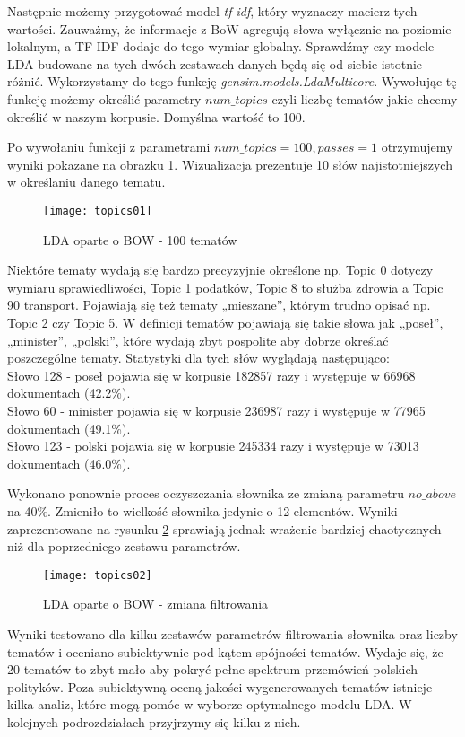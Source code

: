 \documentclass[a4paper,11pt,twoside]{report}
\theoremstyle{definition}
\begin{document}
Następnie możemy przygotować model \textit{tf-idf}, który wyznaczy macierz tych wartości. Zauważmy, że informacje z BoW agregują słowa wyłącznie na poziomie lokalnym, a TF-IDF dodaje do tego wymiar globalny. Sprawdźmy czy modele LDA budowane na tych dwóch zestawach danych będą się od siebie istotnie różnić. Wykorzystamy do tego funkcję \textit{gensim.models.LdaMulticore}. Wywołując tę funkcję możemy określić parametry $num\_topics$ czyli liczbę tematów jakie chcemy określić w naszym korpusie. Domyślna wartość to 100.

Po wywołaniu funkcji z parametrami $ num\_topics=100, passes=1$ otrzymujemy wyniki pokazane na obrazku \ref{tm01}. Wizualizacja prezentuje 10 słów najistotniejszych w określaniu danego tematu. 

\begin{figure}[h] 
\texttt{[image: topics01]} 
\centering \label{tm01} \caption{LDA oparte o BOW - 100 tematów}
\end{figure}
Niektóre tematy wydają się bardzo precyzyjnie określone np. Topic 0 dotyczy wymiaru sprawiedliwości, Topic 1 podatków, Topic 8 to służba zdrowia a Topic 90 transport. Pojawiają się też tematy „mieszane”, którym trudno opisać np. Topic 2 czy Topic 5. W definicji tematów pojawiają się takie słowa jak „poseł”, „minister”, „polski”, które wydają zbyt pospolite aby dobrze określać poszczególne tematy. Statystyki dla tych słów wyglądają następująco:\\
Słowo 128 - poseł pojawia się w korpusie 182857 razy i występuje w 66968 dokumentach (42.2\%).\\
Słowo 60 - minister pojawia się w korpusie 236987 razy i występuje w 77965 dokumentach (49.1\%).\\
Słowo 123 - polski pojawia się w korpusie 245334 razy i występuje w 73013 dokumentach (46.0\%).

Wykonano ponownie proces oczyszczania słownika ze zmianą parametru $no\_above$ na 40\%. Zmieniło to wielkość słownika jedynie o 12 elementów. Wyniki zaprezentowane na rysunku \ref{tm002} sprawiają jednak wrażenie bardziej chaotycznych niż dla poprzedniego zestawu parametrów.

\begin{figure}[h] 
\texttt{[image: topics02]} 
\centering \label{tm002} \caption{LDA oparte o BOW - zmiana filtrowania}
\end{figure}

Wyniki testowano dla kilku zestawów parametrów filtrowania słownika oraz liczby tematów i oceniano subiektywnie pod kątem spójności tematów. Wydaje się, że 20 tematów to zbyt mało aby pokryć pełne spektrum przemówień polskich polityków. Poza subiektywną oceną jakości wygenerowanych tematów istnieje kilka analiz, które mogą pomóc w wyborze optymalnego modelu LDA. W kolejnych podrozdziałach przyjrzymy się kilku z nich.
\end{document}
